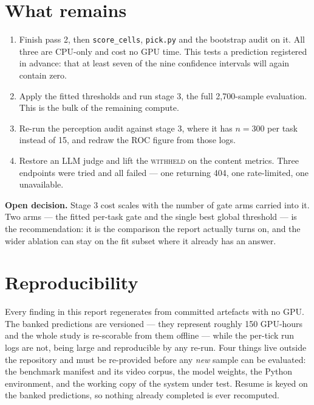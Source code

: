 \documentclass[11pt,a4paper]{article}
\newcommand{\WITHHELD}{\textsc{withheld}}
\begin{document}
\section{What remains}

\begin{enumerate}
\item Finish pass 2, then \texttt{score\_cells}, \texttt{pick.py} and the
      bootstrap audit on it. All three are CPU-only and cost no GPU time. This
      tests a prediction registered in advance: that at least seven of the nine
      confidence intervals will again contain zero.
\item Apply the fitted thresholds and run stage 3, the full 2{,}700-sample
      evaluation. This is the bulk of the remaining compute.
\item Re-run the perception audit against stage 3, where it has $n=300$ per task
      instead of 15, and redraw the ROC figure from those logs.
\item Restore an LLM judge and lift the \WITHHELD{} on the content metrics. Three
      endpoints were tried and all failed --- one returning 404, one rate-limited,
      one unavailable.
\end{enumerate}

\textbf{Open decision.} Stage 3 cost scales with the number of gate arms
carried into it. Two arms --- the fitted per-task gate and the single best global
threshold --- is the recommendation: it is the comparison the report actually
turns on, and the wider ablation can stay on the fit subset where it already has
an answer.

\section{Reproducibility}

Every finding in this report regenerates from committed artefacts with
no GPU. The banked predictions are versioned --- they represent roughly 150
GPU-hours and the whole study is re-scorable from them offline --- while the
per-tick run logs are not, being large and reproducible by any re-run. Four
things live outside the repository and must be re-provided before any \emph{new}
sample can be evaluated: the benchmark manifest and its video corpus, the model
weights, the Python environment, and the working copy of the system under test.
Resume is keyed on the banked predictions, so nothing already completed is ever
recomputed.
\end{document}
